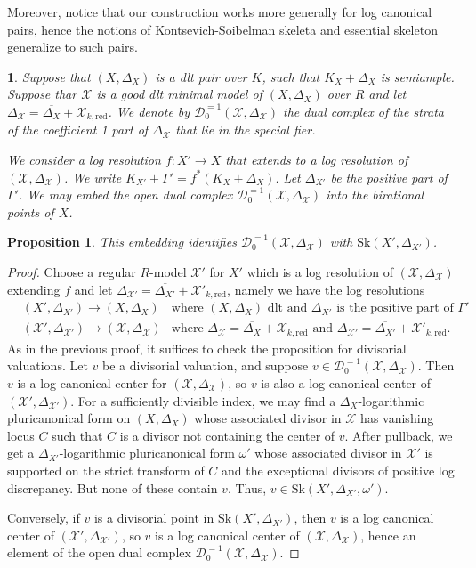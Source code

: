 \documentclass{amsart}%
\numberwithin{equation}{subsection}
\theoremstyle{plain2}
\newtheorem{prop}[equation]{Proposition}
\theoremstyle{definition2}
\theoremstyle{stepstyle}
\theoremstyle{point}
\theoremstyle{subpoint}
\newtheorem{subpoint}[equation]{}%
\newcommand{\spa}[1]{\begin{subpoint}#1\end{subpoint}}           %
\newcommand{\cX}{\ensuremath{\mathscr{X}}}
\newcommand{\redu}{\mathrm{red}}
\newcommand{\Sk}{\mathrm{Sk}}
\begin{document}
Moreover, notice that our construction works more generally for log canonical pairs, hence the notions of Kontsevich-Soibelman skeleta and essential skeleton generalize to such pairs.

\spa{Suppose that $(X,\Delta_X)$ is a dlt pair over $K$, such that $K_X + \Delta_X$ is semiample. Suppose thar $\cX$ is a good dlt minimal model of $(X,\Delta_X)$ over $R$ and let $\Delta_\cX=\overline{\Delta_X} + \cX_{k,\redu}$. We denote by $\mathcal{D}_0^{=1}(\cX, \Delta_\cX)$ the dual complex of the strata of the coefficient 1 part of $\Delta_{\cX}$ that lie in the special fier.

We consider a log resolution $f:X' \rightarrow X$ that extends to a log resolution of $(\cX,\Delta_\cX)$. We write $K_{X'} + \Gamma' = f^*(K_X + \Delta_X)$. Let $\Delta_{X'}$ be the positive part of $\Gamma'$. We may embed the open dual complex $\mathcal{D}_0^{=1}(\cX, \Delta_\cX)$ into the birational points of $X$.
}
\begin{prop} \label{prop dual complex minimal good dlt = essential skeleton any resolution}
This embedding identifies $\mathcal{D}_0^{=1}(\cX, \Delta_\cX)$ with $\Sk(X',\Delta_{X'})$.
\end{prop}
\begin{proof}
Choose a regular $R$-model $\cX'$ for $X'$ which is a log resolution of $(\cX, \Delta_\cX)$ extending $f$ and let  $\Delta_{\cX'}=\overline{\Delta_{X'}} + \cX'_{k,\redu}$, namely we have the log resolutions \begin{align*}
&(X', \Delta_{X'}) \rightarrow (X,\Delta_X) & \text{where }(X,\Delta_X) \text{ dlt and }\Delta_{X'} \text{ is the positive part of }\Gamma'\\
&(\cX', \Delta_{\cX'}) \rightarrow (\cX,\Delta_\cX) & \text{where }\Delta_\cX=\overline{\Delta_X} + \cX_{k,\redu} \text{ and } \Delta_{\cX'}=\overline{\Delta_{X'}} + \cX'_{k,\redu}.
\end{align*} As in the previous proof, it suffices to check the proposition for divisorial valuations. Let $v$ be a divisorial valuation, and suppose $v \in \mathcal{D}_0^{=1}(\cX,\Delta_\cX)$. Then $v$ is a log canonical center for $(\cX,\Delta_\cX)$, so $v$ is also a log canonical center of $(\cX', \Delta_{\cX'})$. For a sufficiently divisible index, we may find a $\Delta_X$-logarithmic pluricanonical form on $(X,\Delta_X)$ whose associated divisor in $\cX$ has vanishing locus $C$ such that $C$ is a divisor not containing the center of $v$. After pullback, we get a $\Delta_{X'}$-logarithmic pluricanonical form $\omega'$ whose associated divisor in $\cX'$ is supported on the strict transform of $C$ and the exceptional divisors of positive log discrepancy. But none of these contain $v$. Thus, $v \in \Sk(X',\Delta_{X'},\omega')$.

Conversely, if $v$ is a divisorial point in $\Sk(X', \Delta_{X'})$, then $v$ is a log canonical center of $(\cX', \Delta_{\cX'})$, so $v$ is a log canonical center of $(\cX, \Delta_\cX)$, hence an element of the open dual complex $\mathcal{D}_0^{=1}(\cX, \Delta_\cX)$.
\end{proof}
\end{document}
